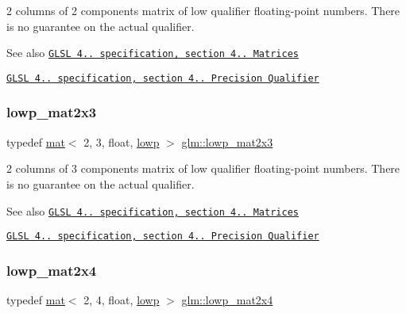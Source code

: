 2 columns of 2 components matrix of low qualifier floating-\/point numbers. There is no guarantee on the actual qualifier.

\begin{DoxySeeAlso}{See also}
\href{http://www.opengl.org/registry/doc/GLSLangSpec.4.20.8.pdf}{\tt G\+L\+SL 4.. specification, section 4.. Matrices} 

\href{http://www.opengl.org/registry/doc/GLSLangSpec.4.20.8.pdf}{\tt G\+L\+SL 4.. specification, section 4.. Precision Qualifier} 
\end{DoxySeeAlso}
\mbox{\label{group__core__precision_gafb73af64c7fb56c398efec50b5cb5108}} 
\subsubsection{\texorpdfstring{lowp\+\_\+mat2x3}{lowp\_mat2x3}}
{\footnotesize\ttfamily typedef \hyperlink{structglm_1_1mat}{mat}$<$ 2, 3, float, \hyperlink{namespaceglm_a36ed105b07c7746804d7fdc7cc90ff25ae161af3fc695e696ce3bf69f7332bc2d}{lowp} $>$ \hyperlink{group__core__precision_gafb73af64c7fb56c398efec50b5cb5108}{glm\+::lowp\+\_\+mat2x3}}

2 columns of 3 components matrix of low qualifier floating-\/point numbers. There is no guarantee on the actual qualifier.

\begin{DoxySeeAlso}{See also}
\href{http://www.opengl.org/registry/doc/GLSLangSpec.4.20.8.pdf}{\tt G\+L\+SL 4.. specification, section 4.. Matrices} 

\href{http://www.opengl.org/registry/doc/GLSLangSpec.4.20.8.pdf}{\tt G\+L\+SL 4.. specification, section 4.. Precision Qualifier} 
\end{DoxySeeAlso}
\mbox{\label{group__core__precision_ga674d889016f44d1084ec467c73df8434}} 
\subsubsection{\texorpdfstring{lowp\+\_\+mat2x4}{lowp\_mat2x4}}
{\footnotesize\ttfamily typedef \hyperlink{structglm_1_1mat}{mat}$<$ 2, 4, float, \hyperlink{namespaceglm_a36ed105b07c7746804d7fdc7cc90ff25ae161af3fc695e696ce3bf69f7332bc2d}{lowp} $>$ \hyperlink{group__core__precision_ga674d889016f44d1084ec467c73df8434}{glm\+::lowp\+\_\+mat2x4}}

